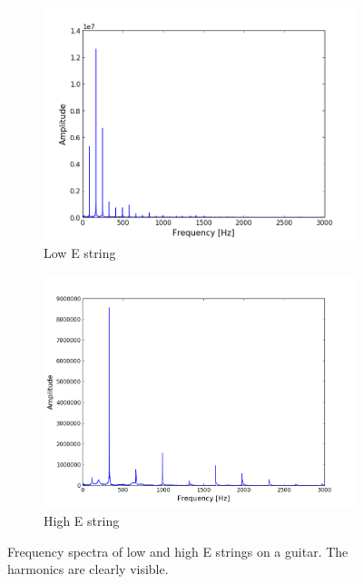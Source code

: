 \begin{figure}[H]
\centering
\begin{subfigure}{0.49\textwidth}
\centering
\includegraphics[width=\textwidth]{figures/freqanal/single_low.png}
\caption{Low E string}
\label{fig:single_low}
\end{subfigure}
\begin{subfigure}{0.49\textwidth}
\centering
\includegraphics[width=\textwidth]{figures/freqanal/single_high.png}
\caption{High E string}
\label{fig:single_high}
\end{subfigure}
\caption{Frequency spectra of low and high E strings on a guitar. The harmonics are clearly visible.}
\label{fig:single}
\end{figure}

